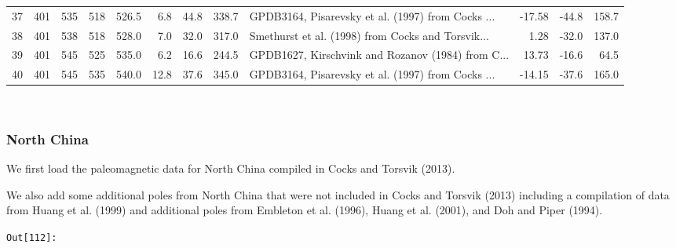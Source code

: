 \documentclass[11pt]{article}
\begin{document}
\begin{sidewaystable}
{\begin{tabular}{lrrrrrrrlrrr}
37 &       401 &       535 &      518 &       526.5 &   6.8 &  44.8 &  338.7 &  GPDB3164, Pisarevsky et al. (1997) from Cocks ... &    -17.58 &   -44.8 &   158.7 \\
38 &       401 &       538 &      518 &       528.0 &   7.0 &  32.0 &  317.0 &  Smethurst et al. (1998) from Cocks and Torsvik... &      1.28 &   -32.0 &   137.0 \\
39 &       401 &       545 &      525 &       535.0 &   6.2 &  16.6 &  244.5 &  GPDB1627, Kirschvink and Rozanov (1984) from C... &     13.73 &   -16.6 &    64.5 \\
40 &       401 &       545 &      535 &       540.0 &  12.8 &  37.6 &  345.0 &  GPDB3164, Pisarevsky et al. (1997) from Cocks ... &    -14.15 &   -37.6 &   165.0 \\
\bottomrule
\end{tabular}}
\end{sidewaystable}
    


    \begin{center}
    \end{center}
    { \hspace*{\fill} \\}
    
    \subsubsection{North China}\label{north-china}

    We first load the paleomagnetic data for North China compiled in Cocks
and Torsvik (2013).


    We also add some additional poles from North China that were not
included in Cocks and Torsvik (2013) including a compilation of data
from Huang et al. (1999) and additional poles from Embleton et al.
(1996), Huang et al. (2001), and Doh and Piper (1994).

\texttt{\color{outcolor}Out[{\color{outcolor}112}]:}
    
\end{document}
